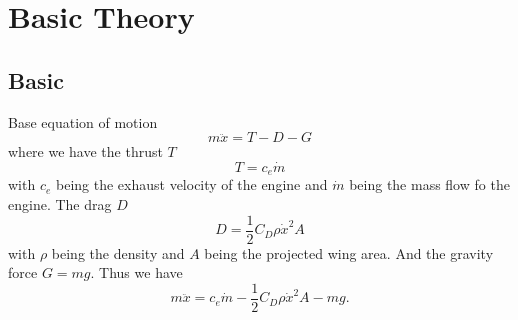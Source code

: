 \section{Basic Theory}

\subsection{Basic}
Base equation of motion
\begin{equation}
	m \ddot{x} = T - D - G
\end{equation}
where we have the thrust $T$
\begin{equation}
	T = c_e \dot{m}
\end{equation}
with $c_e$ being the exhaust velocity of the engine and $\dot{m}$ being the mass flow fo the engine.
The drag $D$
\begin{equation}
	D = \frac{1}{2} C_D \rho \dot{x}^2 A
\end{equation}
with $\rho$ being the density and $A$ being the projected wing area.
And the gravity force $G = m g$.
Thus we have
\begin{equation}
	m \ddot{x} = c_e \dot{m} - \frac{1}{2} C_D \rho \dot{x}^2 A - m g.
\end{equation}

